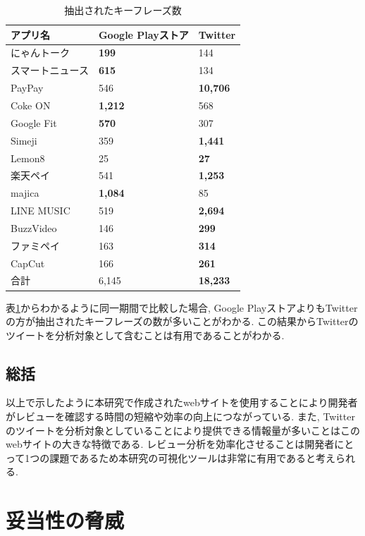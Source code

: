 \begin{table}[H]
  \small
  \caption{抽出されたキーフレーズ数}
  \label{tb:app_count}
  \begin{center}
  \begin{tabularx}{\linewidth}{X|X|X}
    \hline
    アプリ名&Google Playストア&Twitter\\\hline\hline
    にゃんトーク&\textbf{199}&144\\\hline
    スマートニュース&\textbf{615}&134\\\hline
    PayPay&546&\textbf{10,706}\\\hline
    Coke ON&\textbf{1,212}&568\\\hline
    Google Fit&\textbf{570}&307\\\hline
    Simeji&359&\textbf{1,441}\\\hline
    Lemon8&25&\textbf{27}\\\hline
    楽天ペイ&541&\textbf{1,253}\\\hline
    majica&\textbf{1,084}&85\\\hline
    LINE MUSIC&519&\textbf{2,694}\\\hline
    BuzzVideo&146&\textbf{299}\\\hline
    ファミペイ&163&\textbf{314}\\\hline
    CapCut&166&\textbf{261}\\\hline\hline
    合計&6,145&\textbf{18,233}\\\hline
  \end{tabularx}\end{center}
\end{table}

\noindent
表\ref{tb:app_count}からわかるように同一期間で比較した場合, Google PlayストアよりもTwitterの方が抽出されたキーフレーズの数が多いことがわかる. 
この結果からTwitterのツイートを分析対象として含むことは有用であることがわかる. 

\subsection{総括}
以上で示したように本研究で作成されたwebサイトを使用することにより開発者がレビューを確認する時間の短縮や効率の向上につながっている. また, Twitterのツイートを分析対象としていることにより提供できる情報量が多いことはこのwebサイトの大きな特徴である. レビュー分析を効率化させることは開発者にとって1つの課題であるため本研究の可視化ツールは非常に有用であると考えられる. 

\section{妥当性の脅威}
